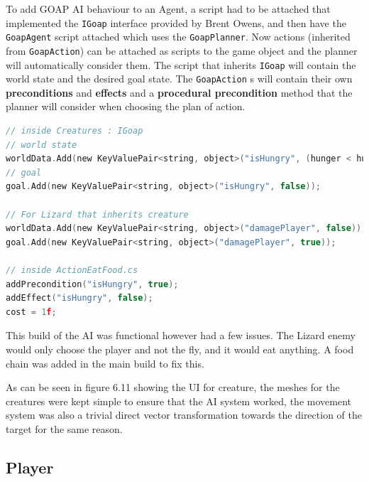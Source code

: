 \documentclass[11pt]{report}
\begin{document}
To add GOAP AI behaviour to an Agent, a script had to be attached that implemented the \lstinline{IGoap} interface provided by Brent Owens, and then have the \lstinline{GoapAgent} script attached which uses the \lstinline{GoapPlanner}. Now actions (inherited from \lstinline{GoapAction}) can be attached as scripts to the game object and the planner will automatically consider them. The script that inherits \lstinline{IGoap} will contain the world state and the desired goal state. The \lstinline{GoapAction} s will contain their own \textbf{preconditions} and \textbf{effects} and a \textbf{procedural precondition} method that the planner will consider when choosing the plan of action. 

\begin{lstlisting}[language=c]
// inside Creatures : IGoap 
// world state
worldData.Add(new KeyValuePair<string, object>("isHungry", (hunger < hungerThreshold)));
// goal
goal.Add(new KeyValuePair<string, object>("isHungry", false));

// For Lizard that inherits creature
worldData.Add(new KeyValuePair<string, object>("damagePlayer", false)); 
goal.Add(new KeyValuePair<string, object>("damagePlayer", true));
 
// inside ActionEatFood.cs
addPrecondition("isHungry", true);
addEffect("isHungry", false);
cost = 1f;
\end{lstlisting}

This build of the AI was functional however had a few issues. The Lizard enemy would only choose the player and not the fly, and it would eat anything. A food chain was added in the main build to fix this.

As can be seen in figure 6.11 showing the UI for creature, the meshes for the creatures were kept simple to ensure that the AI system worked, the movement system was also a trivial direct vector transformation towards the direction of the target for the same reason.

\subsection{Player}
\end{document}
